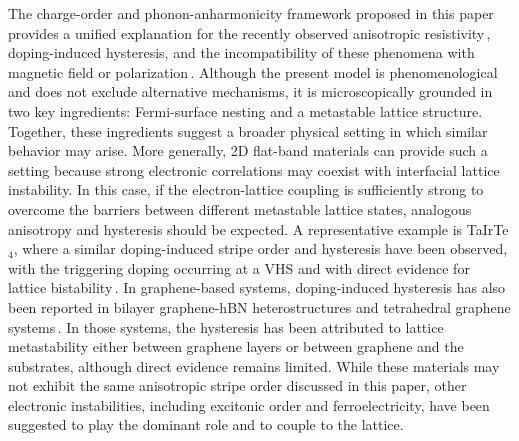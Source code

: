 \documentclass[aps,prx,article,twocolumn,amsmath,amssymb,superscriptaddress,longbibliography]{revtex4-2}
\begin{document}
The charge-order and phonon-anharmonicity framework proposed in this paper provides a unified explanation for the recently observed anisotropic resistivity\,\cite{qin2025extreme,morissette2025superconductivity}, doping-induced hysteresis, and the incompatibility of these phenomena with magnetic field or polarization\,\cite{zhao2026hysteretical}. Although the present model is phenomenological and does not exclude alternative mechanisms, it is microscopically grounded in two key ingredients: Fermi-surface nesting and a metastable lattice structure. Together, these ingredients suggest a broader physical setting in which similar behavior may arise. More generally, 2D flat-band materials can provide such a setting because strong electronic correlations may coexist with interfacial lattice instability. In this case, if the electron-lattice coupling is sufficiently strong to overcome the barriers between different metastable lattice states, analogous anisotropy and hysteresis should be expected. A representative example is TaIrTe$_4$, where a similar doping-induced stripe order and hysteresis have been observed, with the triggering doping occurring at a VHS and with direct evidence for lattice bistability\,\cite{tang2026bistable}. In graphene-based systems, doping-induced hysteresis has also been reported in bilayer graphene-hBN heterostructures and tetrahedral graphene systems\,\cite{zheng2023electronic, singh2026stacking}. In those systems, the hysteresis has been attributed to lattice metastability either between graphene layers or between graphene and the substrates, although direct evidence remains limited. While these materials may not exhibit the same anisotropic stripe order discussed in this paper, other electronic instabilities, including excitonic order and ferroelectricity, have been suggested to play the dominant role and to couple to the lattice.
\end{document}
